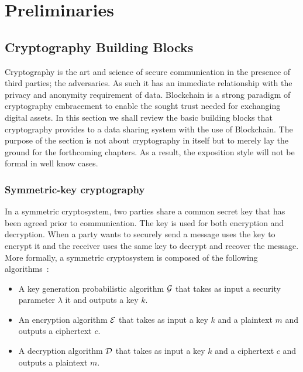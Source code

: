 \chapter{Preliminaries}
\label{preliminaries}

\section{Cryptography Building Blocks}
\label{preliminaries:crypto_block}

Cryptography is the art and science of secure communication in the presence of third parties; the adversaries. As such it has an immediate relationship with the privacy and anonymity requirement of data. Blockchain is a strong paradigm of cryptography embracement to enable the sought trust needed for exchanging digital assets. In this section we shall review the basic building blocks that cryptography provides to a data sharing system with the use of Blockchain. The purpose of the section is not about cryptography in itself but to merely lay the ground for the forthcoming chapters. As a result, the exposition style will not be formal in well know cases.

\subsection{Symmetric-key cryptography}
\label{preliminaries:crypto_block:sym}

In a symmetric cryptosystem, two parties share a common secret key that has been agreed prior to communication. The key is used for both encryption and decryption. When a party wants to securely send a message uses the key to encrypt it and the receiver uses the same key to decrypt and recover the message. More formally, a symmetric cryptosystem is composed of the following algorithms~\cite{Katz:2014:IMC:2700550, kiagias:crypto}:

\begin{itemize}
  \item A key generation probabilistic algorithm $\mathcal{G}$ that takes as input a security parameter $\lambda$ it and outputs a key $k$.
  \item An encryption algorithm $\mathcal{E}$ that takes as input a key $k$ and a plaintext $m$ and outputs a ciphertext $c$.
  \item A decryption algorithm $\mathcal{D}$ that takes as input a key $k$ and a ciphertext $c$ and outputs a plaintext $m$.
\end{itemize}

